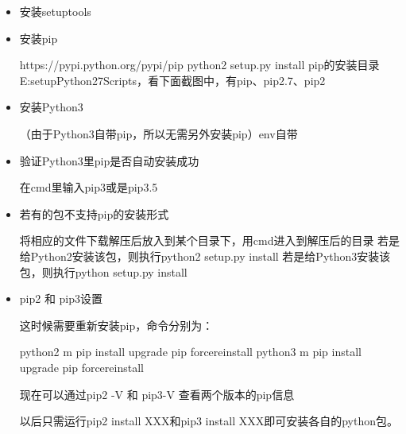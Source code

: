 \documentclass[letterpaper,12pt,english]{sphinxmanual}
\begin{document}
\begin{itemize}
\item {} 
安装setuptools

\begin{sphinxVerbatim}[commandchars=\\\{\}]
  
\end{sphinxVerbatim}

\item {} 
安装pip

\begin{sphinxVerbatim}[commandchars=\\\{\}]
https://pypi.python.org/pypi/pip
python2 setup.py install
pip的安装目录E:\PYGZbs{}setup\PYGZbs{}Python27\PYGZbs{}Scripts，看下面截图中，有pip、pip2.7、pip2
\end{sphinxVerbatim}

\item {} 
安装Python3

（由于Python3自带pip，所以无需另外安装pip）env自带

\item {} 
验证Python3里pip是否自动安装成功

在cmd里输入pip3或是pip3.5

\item {} 
若有的包不支持pip的安装形式

\begin{sphinxVerbatim}[commandchars=\\\{\}]
将相应的文件下载解压后放入到某个目录下，用cmd进入到解压后的目录
若是给Python2安装该包，则执行python2 setup.py install
若是给Python3安装该包，则执行python setup.py install
\end{sphinxVerbatim}

\item {} 
pip2 和 pip3设置

这时候需要重新安装pip，命令分别为：

\begin{sphinxVerbatim}[commandchars=\\\{\}]
python2 \PYGZhy{}m pip install \textendash{}upgrade pip \textendash{}force\PYGZhy{}reinstall
python3 \PYGZhy{}m pip install \textendash{}upgrade pip \textendash{}force\PYGZhy{}reinstall
\end{sphinxVerbatim}

现在可以通过pip2 -V 和 pip3-V 查看两个版本的pip信息

以后只需运行pip2 install XXX和pip3 install
XXX即可安装各自的python包。

\end{itemize}
\end{document}
